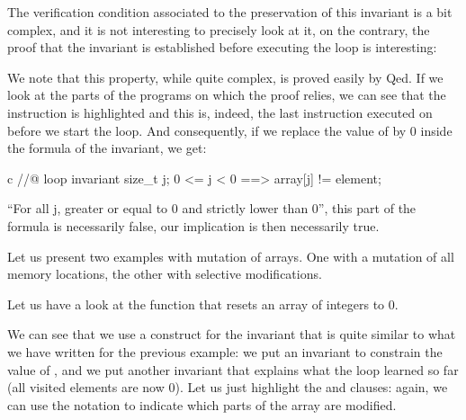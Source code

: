 The verification condition associated to the preservation of this invariant is
a bit complex, and it is not interesting to precisely look at it,
on the contrary, the proof that the invariant is established before
executing the loop is interesting:





We note that this property, while quite complex, is proved easily
by Qed. If we look at the parts of the programs on which the proof
relies, we can see that the instruction  is highlighted
and this is, indeed, the last instruction executed on  before
we start the loop. And consequently, if we replace the value of
 by 0 inside the formula of the invariant, we get:



\begin{CodeBlock}{c}
//@ loop invariant \forall size_t j; 0 <= j < 0 ==> array[j] != element;
\end{CodeBlock}



``For all j, greater or equal to 0 and strictly lower than 0'', this
part of the formula is necessarily false, our implication is then
necessarily true.





Let us present two examples with mutation of arrays. One with a mutation
of all memory locations, the other with selective modifications.





Let us have a look at the function that resets an array of integers to 0.






We can see that we use a construct for the invariant that is quite similar
to what we have written for the previous example: we put an invariant to
constrain the value of , and we put another invariant that
explains what the loop learned so far (all visited elements are now
$0$). Let us just highlight the  and
 clauses: again, we can use the notation
 to indicate which parts of the array are modified.



